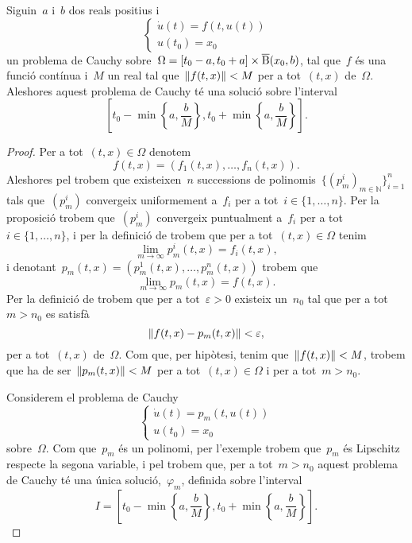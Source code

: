\documentclass[../../Main.tex]{subfiles}
\begin{document}
	\begin{theorem}
		\label{thm:Teorema de Peano}
		Siguin~\(a\) i~\(b\) dos reals positius i
		\begin{equation}
			\label{thm:Teorema de Peano:eq3}
			\begin{cases}
				\displaystyle\dot{u}(t)=f(t,u(t)) \\
				\displaystyle u(t_{0})=x_{0}
			\end{cases}
		\end{equation}
		un problema de Cauchy sobre~\(\Omega=[t_{0}-a,t_{0}+a]\times\overline{\operatorname{B}}(x_{0},b)\), tal que~\(f\) és una funció contínua i~\(M\) un real tal que~\(\norm{f(t,x)}<M\) per a tot~\((t,x)\) de~\(\Omega\).
		Aleshores aquest problema de Cauchy té una solució sobre l'interval
		\[
		    \left[t_{0}-\min\left\{a,\frac{b}{M}\right\},t_{0}+\min\left\{a,\frac{b}{M}\right\}\right].
		\]
		\begin{proof} %
			Per a tot~\((t,x)\in\Omega\) denotem
			\[
			    f(t,x)=(f_{1}(t,x),\dots,f_{n}(t,x)).
			\]
			Aleshores pel  trobem que existeixen~\(n\) successions de polinomis~\(\{(p_{m}^{i})_{m\in\mathbb{N}}\}_{i=1}^{n}\) tals que~\((p_{m}^{i})\) convergeix uniformement a~\(f_{i}\) per a tot~\(i\in\{1,\dots,n\}\).
			Per la proposició  trobem que~\((p_{m}^{i})\) convergeix puntualment a~\(f_{i}\) per a tot~\(i\in\{1,\dots,n\}\), i per la definició de  trobem que per a tot~\((t,x)\in\Omega\) tenim
			\[
			    \lim_{m\to\infty}p_{m}^{i}(t,x)=f_{i}(t,x),
			\]
			i denotant~\(p_{m}(t,x)=(p_{m}^{1}(t,x),\dots,p_{m}^{n}(t,x))\) trobem que
			\begin{equation}
				\label{thm:Teorema de Peano:eq2}
				\lim_{m\to\infty}p_{m}(t,x)=f(t,x).
			\end{equation}
			Per la definició de  trobem que per a tot~\(\varepsilon>0\) existeix un~\(n_{0}\) tal que per a tot~\(m>n_{0}\) es satisfà
			\[
			    \norm{f(t,x)-p_{m}(t,x)}<\varepsilon,
			\]
			per a tot~\((t,x)\) de~\(\Omega\).
			Com que, per hipòtesi, tenim que~\(\norm{f(t,x)}<M\), trobem que ha de ser~\(\norm{p_{m}(t,x)}<M\) per a tot~\((t,x)\in\Omega\) i per a tot~\(m>n_{0}\).

			Considerem el problema de Cauchy
			\[\begin{cases}
				\displaystyle\dot{u}(t)=p_{m}(t,u(t)) \\
				\displaystyle u(t_{0})=x_{0}
			\end{cases}\] %
			sobre~\(\Omega\).
			Com que~\(p_{m}\) és un polinomi, per l'exemple  trobem que~\(p_{m}\) és Lipschitz respecte la segona variable, i pel  trobem que, per a tot~\(m>n_{0}\) aquest problema de Cauchy té una única solució,~\(\varphi_{m}\), definida sobre l'interval
			\[
			    I=\left[t_{0}-\min\left\{a,\frac{b}{M}\right\},t_{0}+\min\left\{a,\frac{b}{M}\right\}\right].
			\]


\end{proof}
\end{theorem}
\end{document}
